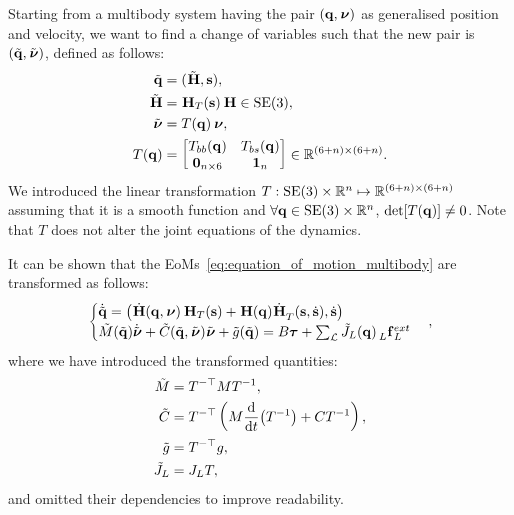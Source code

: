 Starting from a multibody system having the pair $(\Qu, \Nu)$ as generalised position and velocity, we want to find a change of variables such that the new pair is $(\tilde{\Qu}, \tilde{\Nu})$, defined as follows: 
%
\begin{align*}
    \tilde{\Qu} &= (\Tilde{\homo}, \Shape) ,\\
    \tilde{\homo} &= \homo_T(\Shape) \homo \in \SE(3) ,\\
    \tilde{\Nu} &= T(\Qu) \Nu ,\\
    T(\Qu) &=
    \begin{bmatrix}
        T_{bb}(\Qu) & T_{bs}(\Qu) \\
        \zeros_{n\times6} & \ones_{n}
    \end{bmatrix} \in \realn^{(6+n)\times(6+n)}
    .
\end{align*}
%
We introduced the linear transformation $T: \SE(3)\times\realn^n \mapsto \realn^{(6+n)\times(6+n)}$ assuming that it is a smooth function and $\forall \Qu \in \SE(3)\times\realn^n$, $\det[T(\Qu)] \neq 0$.
Note that $T$ does not alter the joint equations of the dynamics.

It can be shown that the \acp{EoM}~\eqref{eq:equation_of_motion_multibody} are transformed as follows:
%
\begin{equation*}
    \begin{cases}
        \dot{\tilde{\Qu}} = \left( \homod(\Qu, \Nu) \homo_T(\Shape) + \homo(\Qu) \dot{\homo}_T(\Shape, \Shaped), \Shaped \right) \\
        \tilde{M}(\tilde{\Qu}) \dot{\tilde{\boldsymbol{\nu}}} + \tilde{C}(\tilde{\Qu}, \tilde{\Nu}) \tilde{\Nu} + \tilde{g}(\tilde{\Qu}) = B \Torques + \sum_{\mathcal{L}} \tilde{J}_L(\Qu) \forcesix[L]_L^{ext}
    \end{cases}
    ,
\end{equation*}
%
where we have introduced the transformed quantities:
%
\begin{equation}
    \label{eq:eom_change_of_variables}
    \begin{aligned}
        \tilde{M} &= T^{-\top} M T^{-1} ,\\
        \tilde{C} &= T^{-\top} \left( M \dv{t}(T^{-1}) + CT^{-1} \right) ,\\
        \tilde{g} &= T^{-\top} g ,\\
        \tilde{J}_L &= J_L T,
    \end{aligned}  
\end{equation}
%
and omitted their dependencies to improve readability.

